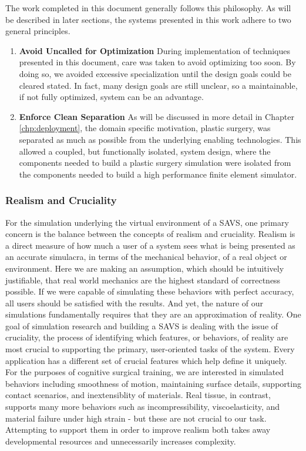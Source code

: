 The work completed in this document generally follows this
philosophy. As will be described in later sections, the systems
presented in this work adhere to two general principles.

\begin{enumerate}
\item \textbf{Avoid Uncalled for Optimization} During implementation
  of techniques presented in this document, care was taken to avoid
  optimizing too soon. By doing so, we avoided excessive
  specialization until the design goals could be cleared stated. In
  fact, many design goals are still unclear, so a maintainable, if not
  fully optimized, system can be an advantage.
  
\item \textbf{Enforce Clean Separation} As will be discussed in more
  detail in Chapter \ref{chp:deployment}, the domain specific
  motivation, plastic surgery, was separated as much as possible from
  the underlying enabling technologies. This allowed a coupled, but
  functionally isolated, system design, where the components needed to
  build a plastic surgery simulation were isolated from the components
  needed to build a high performance finite element simulator.
  
\end{enumerate}


\subsubsection{Realism and Cruciality}

For the simulation underlying the virtual environment of a SAVS, one
primary concern is the balance between the concepts of realism and
cruciality. Realism is a direct measure of how much a user of a system
sees what is being presented as an accurate simulacra, in terms of the
mechanical behavior, of a real object or environment. Here we are
making an assumption, which should be intuitively justifiable, that
real world mechanics are the highest standard of correctness
possible. If we were capable of simulating these behaviors with
perfect accuracy, all users should be satisfied with the results. And
yet, the nature of our simulations fundamentally requires that they
are an approximation of reality. One goal of simulation research and
building a SAVS is dealing with the issue of cruciality, the
process of identifying which features, or behaviors, of reality are
most crucial to supporting the primary, user-oriented tasks of the
system. Every application has a different set of crucial features
which help define it uniquely. For the purposes of cognitive surgical
training, we are interested in simulated behaviors including
smoothness of motion, maintaining surface details, supporting contact
scenarios, and inextensiblity of materials. Real tissue, in contrast,
supports many more behaviors such as incompressibility,
viscoelasticity, and material failure under high strain - but these
are not crucial to our task. Attempting to support them in order to
improve realism both takes away developmental resources and
unnecessarily increases complexity.


